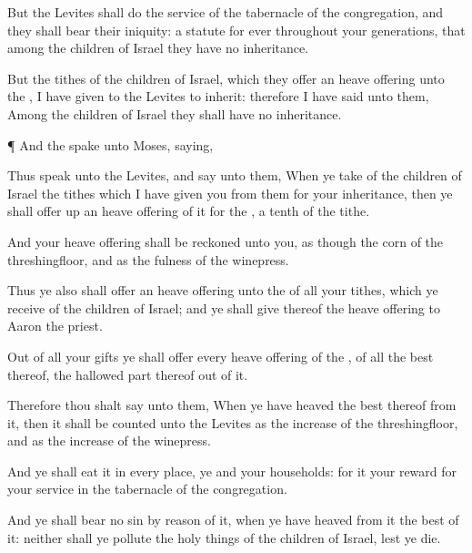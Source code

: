 {But the
Levites shall
do the
service of the
tabernacle of the
congregation, and they shall
bear their
iniquity:
{} a
statute for
ever throughout your
generations, that
among the
children of
Israel they
have no
inheritance.

But the
tithes of the
children of
Israel, which they
offer
{} an heave
offering unto the
{}, I have
given to the
Levites to
inherit: therefore I have
said unto them,
Among the
children of
Israel they shall
have no
inheritance.


\par }{\PP {}¶ And the
{}
spake unto
Moses,
saying,

Thus
speak unto the
Levites, and
say unto them, When ye
take of the
children of
Israel the
tithes which I have
given you from them for your
inheritance, then ye shall
offer up an heave
offering of it for the
{},
{} a
tenth
{} of the
tithe.

And
{} your heave
offering shall be
reckoned unto you, as though
{} the
corn of the
threshingfloor, and as the
fulness of the
winepress.

Thus ye also shall
offer an heave
offering unto the
{} of all your
tithes, which ye
receive of the
children of
Israel; and ye shall
give thereof the
{} heave
offering to
Aaron the
priest.

Out of all your
gifts ye shall
offer every heave
offering of the
{}, of all the
best thereof,
{} the hallowed
part thereof out of it.

Therefore thou shalt
say unto them, When ye have
heaved the
best thereof from it, then it shall be
counted unto the
Levites as the
increase of the
threshingfloor, and as the
increase of the
winepress.

And ye shall
eat it in every
place, ye and your
households: for it
{} your
reward
for your
service in the
tabernacle of the
congregation.

And ye shall
bear no
sin by reason of it, when ye have
heaved from it the
best of it: neither shall ye
pollute the holy
things of the
children of
Israel, lest ye
die.




\par }
